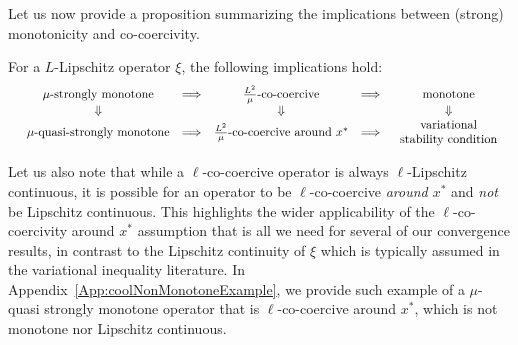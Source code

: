 \documentclass{article}
\begin{document}
Let us now provide a proposition summarizing the implications between (strong) monotonicity and co-coercivity. 
\begin{proposition}
\label{PropositionCocoMonotone}
For a $L$-Lipschitz operator $\xi$, the following implications hold:
\[
\begin{array}
[c]{cccccccc}
& \mu\text{-strongly monotone} & \Longrightarrow & \frac{L^2}{\mu}\text{-co-coercive}
 & \Longrightarrow  & \text{monotone} \\
&  \Downarrow & & \Downarrow && \Downarrow \\
& \mu\text{-quasi-strongly monotone}   & \Longrightarrow & \frac{L^2}{\mu}\text{-co-coercive around } x^*& \Longrightarrow & \begin{tabular}{c}\text{variational} \\ \text{stability condition} \end{tabular} 
\end{array}
\]
\end{proposition}
Let us also note that while a $\ell$-co-coercive operator is always $\ell$-Lipschitz continuous, it is possible for an operator to be $\ell$-co-coercive \emph{around $x^*$} and \emph{not} be Lipschitz continuous. This highlights the wider applicability of the $\ell$-co-coercivity around $x^*$ assumption that is all we need for several of our convergence results, in contrast to the Lipschitz continuity of $\xi$ which is typically assumed in the variational inequality literature. 
In Appendix~\ref{App:coolNonMonotoneExample}, we provide such example of a $\mu$-quasi strongly monotone operator that is $\ell$-co-coercive around $x^*$, which is not monotone nor Lipschitz continuous. 
\end{document}

